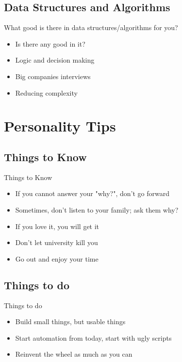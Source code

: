 \documentclass{beamer}
\begin{document}
\subsection{Data Structures and Algorithms}
\begin{frame}{What good is there in data structures/algorithms for you?}
	\begin{itemize}
		\item Is there any good in it?
		\item Logic and decision making
		\item Big companies interviews
		\item Reducing complexity
	\end{itemize}
\end{frame}

\section{Personality Tips}
\subsection{Things to Know}

\begin{frame}{Things to Know}
	\begin{itemize}
		\item If you cannot answer your "why?", don't go forward
		\item Sometimes, don't listen to your family; ask them why?
		\item If you love it, you will get it
		\item Don't let university kill you
		\item Go out and enjoy your time
	\end{itemize}
\end{frame}

\subsection{Things to do}

\begin{frame}{Things to do}
	\begin{itemize}
		\item Build small things, but usable things
		\item Start automation from today, start with ugly scripts
		\item Reinvent the wheel as much as you can
	\end{itemize}
\end{frame}
\end{document}
